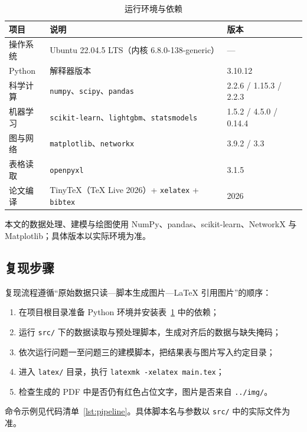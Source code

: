 \begin{table}[htbp]
  \centering
  \caption{运行环境与依赖}
  \label{tab:appendix-env}
  \small
  \begin{tabularx}{\textwidth}{@{}l X l@{}}
    \toprule
    项目 & 说明 & 版本 \\
    \midrule
    操作系统 & Ubuntu 22.04.5 LTS（内核 6.8.0-138-generic） & — \\
    Python & 解释器版本 & 3.10.12 \\
    科学计算 & \texttt{numpy}、\texttt{scipy}、\texttt{pandas} & 2.2.6 / 1.15.3 / 2.2.3 \\
    机器学习 & \texttt{scikit-learn}、\texttt{lightgbm}、\texttt{statsmodels} & 1.5.2 / 4.5.0 / 0.14.4 \\
    图与网络 & \texttt{matplotlib}、\texttt{networkx} & 3.9.2 / 3.3 \\
    表格读取 & \texttt{openpyxl} & 3.1.5 \\
    论文编译 & TinyTeX（TeX Live 2026）+ \texttt{xelatex} + \texttt{bibtex} & 2026 \\
    \bottomrule
  \end{tabularx}
\end{table}

本文的数据处理、建模与绘图使用 NumPy\citep{harris2020array}、pandas、scikit-learn\citep{pedregosa2011scikit}、NetworkX\citep{hagberg2008exploring} 与 Matplotlib\citep{hunter2007matplotlib}；具体版本以实际环境为准。

\subsection{复现步骤}

复现流程遵循“原始数据只读—脚本生成图片—LaTeX 引用图片”的顺序：

\begin{enumerate}
  \item 在项目根目录准备 Python 环境并安装表~\ref{tab:appendix-env} 中的依赖；
  \item 运行 \texttt{src/} 下的数据读取与预处理脚本，生成对齐后的数据与缺失掩码；
  \item 依次运行问题一至问题三的建模脚本，把结果表与图片写入约定目录；
  \item 进入 \texttt{latex/} 目录，执行 \texttt{latexmk -xelatex main.tex}；
  \item 检查生成的 PDF 中是否仍有红色占位文字，图片是否来自 \texttt{../img/}。
\end{enumerate}

命令示例见代码清单~\ref{lst:pipeline}。具体脚本名与参数以 \texttt{src/} 中的实际文件为准。

